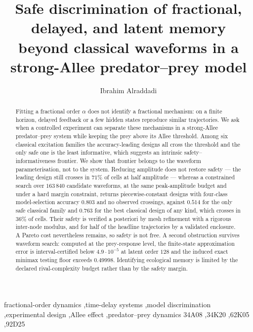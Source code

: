 \documentclass[preprint,12pt]{elsarticle}
\numberwithin{equation}{section}
\theoremstyle{plain}
\theoremstyle{definition}
\theoremstyle{remark}
\begin{document}
\begin{frontmatter}

\title{Safe discrimination of fractional, delayed, and latent memory beyond classical waveforms in a strong-Allee predator--prey model}

\author[iu]{Ibrahim Alraddadi}
\address[iu]{Department of Mathematics, Faculty of Science, Islamic University of Madinah, Madinah 42351, Saudi Arabia}

\begin{abstract}
Fitting a fractional order $\alpha$ does not identify a fractional mechanism: on a finite horizon, delayed feedback or a few hidden states reproduce similar trajectories. We ask when a controlled experiment can separate these mechanisms in a strong-Allee predator--prey system while keeping the prey above its Allee threshold. Among six classical excitation families the accuracy-leading designs all cross the threshold and the only safe one is the least informative, which suggests an intrinsic safety--informativeness frontier. We show that frontier belongs to the waveform parameterisation, not to the system. Reducing amplitude does not restore safety --- the leading design still crosses in $71\%$ of cells at half amplitude --- whereas a constrained search over $163\,840$ candidate waveforms, at the same peak-amplitude budget and under a hard margin constraint, returns piecewise-constant designs with four-class model-selection accuracy $0.803$ and no observed crossings, against $0.514$ for the only safe classical family and $0.763$ for the best classical design of any kind, which crosses in $36\%$ of cells. Their safety is verified a posteriori by mesh refinement with a rigorous inter-node modulus, and for half of the headline trajectories by a validated enclosure. A Pareto cost nevertheless remains, so safety is not free. A second obstruction survives waveform search: computed at the prey-response level, the finite-state approximation error is interval-certified below $4.9\cdot10^{-5}$ at latent order $128$ and the induced exact minimax testing floor exceeds $0.49998$. Identifying ecological memory is limited by the declared rival-complexity budget rather than by the safety margin.
\end{abstract}

\begin{keyword}
fractional-order dynamics \sep time-delay systems \sep model discrimination \sep experimental design \sep Allee effect \sep predator--prey dynamics
\MSC[2020] 34A08 \sep 34K20 \sep 62K05 \sep 92D25
\end{keyword}

\end{frontmatter}
\end{document}

